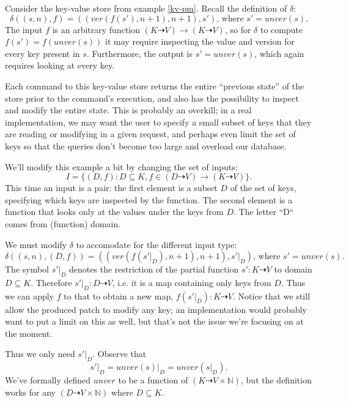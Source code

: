 \documentclass[12pt,a4paper,en]{pracamgr}
\newcommand{\mbb}[1]{\mathbb{#1}}
\newcommand{\res}[2]{\left.#1\right|_{#2}}
\begin{document}
\begin{ex}\label{kv-opt-read}
    Consider the key-value store from example \ref{kv-pm}. Recall the definition of $\delta$:
    $$ \delta((s, n), f) = ((ver(f(s'), n + 1), n + 1), s')\text{, where } s' = unver(s). $$
    The input $f$ is an arbitrary function $(K \dashrightarrow V) \rightarrow (K \dashrightarrow V)$, so for $\delta$ to compute $f(s') = f(unver(s))$ it may require inspecting the value and version for every key present in $s$. Furthermore, the output is $s' = unver(s)$, which again requires looking at every key.

    Each command to this key-value store returns the entire ``previous state'' of the store prior to the command's execution, and also has the possibility to inspect and modify the entire state. This is probably an overkill; in a real implementation, we may want the user to specify a small subset of keys that they are reading or modifying in a given request, and perhaps even limit the set of keys so that the queries don't become too large and overload our database.

    We'll modify this example a bit by changing the set of inputs:
    $$ I = \{(D, f): D \subseteq K, f \in (D \dashrightarrow V) \rightarrow (K \dashrightarrow V)\}. $$
    This time an input is a pair: the first element is a subset $D$ of the set of keys, specifying which keys are inspected by the function. The second element is a function that looks only at the values under the keys from $D$. The letter ``D`` comes from (function) domain.

    We must modify $\delta$ to accomodate for the different input type:
    $$ \delta((s, n), (D, f)) = ((ver(f(\res{s'}{D}), n+1), n+1), \res{s'}{D})\text{, where } s' = unver(s). $$
    The symbol $\res{s'}{D}$ denotes the restriction of the partial function $s': K \dashrightarrow V$ to domain $D \subseteq K$. Therefore $\res{s'}{D}: D \dashrightarrow V$, i.e. it is a map containing only keys from $D$. Thus we can apply $f$ to that to obtain a new map, $f(\res{s'}{D}): K \dashrightarrow V$. Notice that we still allow the produced patch to modify any key; an implementation would probably want to put a limit on this as well, but that's not the issue we're focusing on at the moment.

    Thus we only need $\res{s'}{D}$. Observe that
    $$ \res{s'}{D} = \res{unver(s)}{D} = unver(\res{s}{D}). $$
    We've formally defined $unver$ to be a function of $(K \dashrightarrow V \times \mbb N)$, but the definition works for any $(D \dashrightarrow V \times \mbb N)$ where $D \subseteq K$.


\end{ex}
\end{document}
